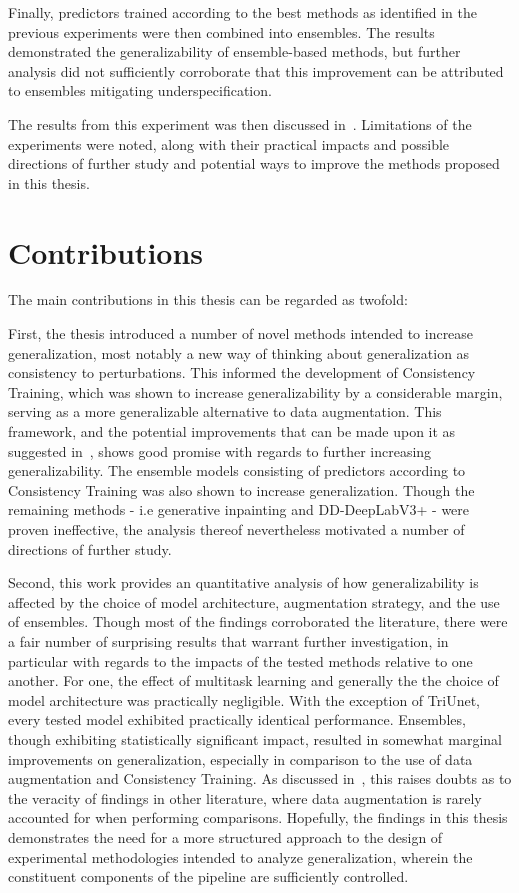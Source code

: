 Finally, predictors trained according to the best methods as identified in the previous experiments were then combined into ensembles. The results demonstrated the generalizability of ensemble-based methods, but further analysis did not sufficiently corroborate that this improvement can be attributed to ensembles mitigating underspecification. 

The results from this experiment was then discussed in~. Limitations of the experiments were noted, along with their practical impacts and possible directions of further study and potential ways to improve the methods proposed in this thesis. 


\section{Contributions}
The main contributions in this thesis can be regarded as twofold:

First, the thesis introduced a number of novel methods intended to increase generalization, most notably a new way of thinking about generalization as consistency to perturbations. This informed the development of Consistency Training, which was shown to increase generalizability by a considerable margin, serving as a more generalizable alternative to data augmentation. This framework, and the potential improvements that can be made upon it as suggested in~, shows good promise with regards to further increasing generalizability. The ensemble models consisting of predictors according to Consistency Training was also shown to increase generalization. Though the remaining methods - i.e generative inpainting and DD-DeepLabV3+ - were proven ineffective, the analysis thereof nevertheless motivated a number of directions of further study. 


Second, this work provides an quantitative analysis  of how generalizability is affected by the choice of model architecture, augmentation strategy, and the use of ensembles. Though most of the findings corroborated the literature, there were a fair number of surprising results that warrant further investigation, in particular with regards to the impacts of the tested methods relative to one another. For one, the effect of multitask learning and generally the the choice of model architecture was practically negligible. With the exception of TriUnet, every tested model exhibited practically identical performance. Ensembles, though exhibiting statistically significant impact, resulted in somewhat marginal improvements on generalization, especially in comparison to the use of data augmentation and Consistency Training. As discussed in~, this raises doubts as to the veracity of findings in other literature, where data augmentation is rarely accounted for when performing comparisons. Hopefully, the findings in this thesis demonstrates the need for a more structured approach to the design of experimental methodologies intended to analyze generalization, wherein the constituent components of the pipeline are sufficiently controlled. 


